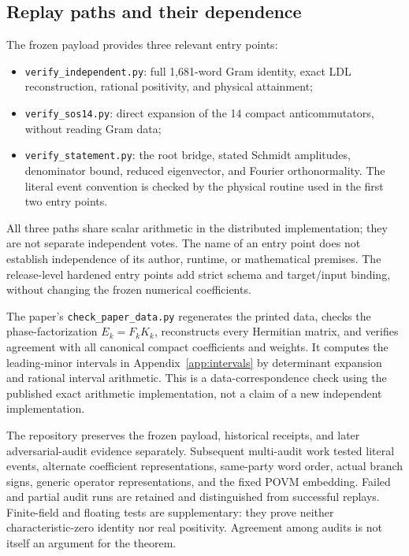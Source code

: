 \documentclass[11pt,a4paper]{article}
\numberwithin{equation}{section}
\theoremstyle{remark}\newtheorem{remark}[theorem]{Remark}
\begin{document}
\subsection{Replay paths and their dependence}
The frozen payload provides three relevant entry points:
\begin{itemize}
\item \texttt{verify\_independent.py}: full 1,681-word Gram identity,
exact LDL reconstruction, rational positivity, and physical attainment;
\item \texttt{verify\_sos14.py}: direct expansion of the 14 compact
anticommutators, without reading Gram data;
\item \texttt{verify\_statement.py}: the root bridge, stated Schmidt
amplitudes, denominator bound, reduced eigenvector, and Fourier
orthonormality. The literal event convention is checked by the physical
routine used in the first two entry points.
\end{itemize}
All three paths share scalar arithmetic in the distributed implementation;
they are not separate independent votes. The name of an entry point does not
establish independence of its author, runtime, or mathematical premises.
The release-level hardened entry points add strict schema and target/input
binding, without changing the frozen numerical coefficients.

The paper's \texttt{check\_paper\_data.py} regenerates the printed data,
checks the phase-factorization $E_k=F_kK_k$, reconstructs every Hermitian
matrix, and verifies agreement with all canonical compact coefficients and
weights. It computes the leading-minor intervals in
Appendix~\ref{app:intervals} by determinant expansion and rational interval
arithmetic. This is a data-correspondence check using the published exact
arithmetic implementation, not a claim of a new independent implementation.

The repository preserves the frozen payload, historical receipts, and later
adversarial-audit evidence separately. Subsequent multi-audit work tested
literal events, alternate coefficient representations, same-party word
order, actual branch signs, generic operator representations, and the fixed
POVM embedding. Failed and partial audit runs are retained and distinguished
from successful replays. Finite-field and floating tests are supplementary:
they prove neither characteristic-zero identity nor real positivity.
Agreement among audits is not itself an argument for the theorem.
\end{document}
